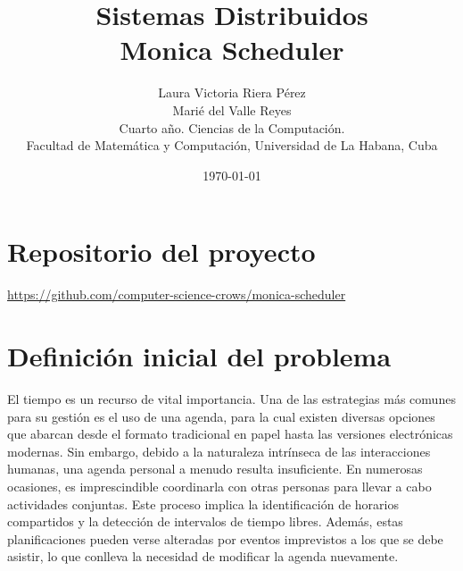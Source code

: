 \documentclass[10pt]{article} %
\title{\normalsize{Sistemas Distribuidos}\\
	\Huge\bfseries Monica Scheduler \\
} %
\author{%
	Laura Victoria Riera P\'erez\\
	Mari\'e del Valle Reyes \vspace{1em} \\
	\small Cuarto a\~no. Ciencias de la Computaci\'on. \\ %
	\small Facultad de Matem\'atica y Computaci\'on, Universidad de La Habana, Cuba \\ %
}
\date{\footnotesize \today } %
\begin{document}
	
	
	
	\maketitle
	
	
	\section*{Repositorio del proyecto}
	
	\begin{center}
		\href{https://github.com/computer-science-crows/monica-scheduler}{https://github.com/computer-science-crows/monica-scheduler}
	\end{center}

	\section{Definici\'on inicial del problema} 
	
	El tiempo es un recurso de vital importancia. Una de las estrategias más comunes para su gestión es el uso de una agenda, para la cual existen diversas opciones que abarcan desde el formato tradicional en papel hasta las versiones electrónicas modernas. Sin embargo, debido a la naturaleza intrínseca de las interacciones humanas, una agenda personal a menudo resulta insuficiente. En numerosas ocasiones, es imprescindible coordinarla con otras personas para llevar a cabo actividades conjuntas. Este proceso implica la identificación de horarios compartidos y la detección de intervalos de tiempo libres. Además, estas planificaciones pueden verse alteradas por eventos imprevistos a los que se debe asistir, lo que conlleva la necesidad de modificar la agenda nuevamente.
	
\end{document}
